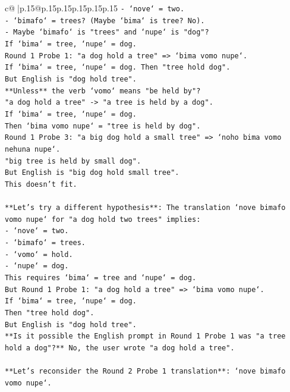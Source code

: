 \documentclass{article}
\begin{document}
{\begin{supertabular}{c@{$\;$}|p{.15\linewidth}@{}p{.15\linewidth}p{.15\linewidth}p{.15\linewidth}p{.15\linewidth}p{.15\linewidth}}
{{{\texttt{{-} `nove` = two.} \\
\texttt{{-} `bimafo` = trees? (Maybe `bima` is tree? No).} \\
\texttt{{-} Maybe `bimafo` is "trees" and `nupe` is "dog"?} \\
\texttt{If `bima` = tree, `nupe` = dog.} \\
\texttt{Round 1 Probe 1: "a dog hold a tree" => `bima vomo nupe`.} \\
\texttt{If `bima` = tree, `nupe` = dog. Then "tree hold dog".} \\
\texttt{But English is "dog hold tree".} \\
\texttt{**Unless** the verb `vomo` means "be held by"?} \\
\texttt{"a dog hold a tree" {-}> "a tree is held by a dog".} \\
\texttt{If `bima` = tree, `nupe` = dog.} \\
\texttt{Then `bima vomo nupe` = "tree is held by dog".} \\
\texttt{Round 1 Probe 3: "a big dog hold a small tree" => `noho bima vomo nehuna nupe`.} \\
\texttt{"big tree is held by small dog".} \\
\texttt{But English is "big dog hold small tree".} \\
\texttt{This doesn't fit.} \\
\\ 
\texttt{**Let's try a different hypothesis**: The translation `nove bimafo vomo nupe` for "a dog hold two trees" implies:} \\
\texttt{{-} `nove` = two.} \\
\texttt{{-} `bimafo` = trees.} \\
\texttt{{-} `vomo` = hold.} \\
\texttt{{-} `nupe` = dog.} \\
\texttt{This requires `bima` = tree and `nupe` = dog.} \\
\texttt{But Round 1 Probe 1: "a dog hold a tree" => `bima vomo nupe`.} \\
\texttt{If `bima` = tree, `nupe` = dog.} \\
\texttt{Then "tree hold dog".} \\
\texttt{But English is "dog hold tree".} \\
\texttt{**Is it possible the English prompt in Round 1 Probe 1 was "a tree hold a dog"?** No, the user wrote "a dog hold a tree".} \\
\\ 
\texttt{**Let's reconsider the Round 2 Probe 1 translation**: `nove bimafo vomo nupe`.} \\
}}}
\end{supertabular}}
\end{document}
